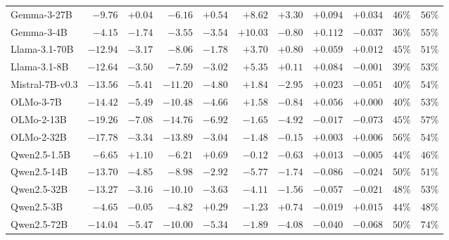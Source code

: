\begin{table}[tb]
\begin{tabular}{lrrrrrrrrrr}
Gemma-3-27B & $\mathbf{-9.76}$ & $+0.04$ & $\mathbf{-6.16}$ & $+0.54$ & $\mathbf{+8.62}$ & $\mathbf{+3.30}$ & $\mathbf{+0.094}$ & $\mathbf{+0.034}$ & $46\%$ & $56\%$ \\
Gemma-3-4B & $\mathbf{-4.15}$ & $\mathbf{-1.74}$ & $\mathbf{-3.55}$ & $\mathbf{-3.54}$ & $\mathbf{+10.03}$ & $-0.80$ & $\mathbf{+0.112}$ & $\mathbf{-0.037}$ & $36\%$ & $55\%$ \\
Llama-3.1-70B & $\mathbf{-12.94}$ & $\mathbf{-3.17}$ & $\mathbf{-8.06}$ & $\mathbf{-1.78}$ & $\mathbf{+3.70}$ & $+0.80$ & $\mathbf{+0.059}$ & $+0.012$ & $45\%$ & $51\%$ \\
Llama-3.1-8B & $\mathbf{-12.64}$ & $\mathbf{-3.50}$ & $\mathbf{-7.59}$ & $\mathbf{-3.02}$ & $\mathbf{+5.35}$ & $+0.11$ & $\mathbf{+0.084}$ & $-0.001$ & $39\%$ & $53\%$ \\
Mistral-7B-v0.3 & $\mathbf{-13.56}$ & $\mathbf{-5.41}$ & $\mathbf{-11.20}$ & $\mathbf{-4.80}$ & $\mathbf{+1.84}$ & $\mathbf{-2.95}$ & $\mathbf{+0.023}$ & $\mathbf{-0.051}$ & $40\%$ & $54\%$ \\
OLMo-3-7B & $\mathbf{-14.42}$ & $\mathbf{-5.49}$ & $\mathbf{-10.48}$ & $\mathbf{-4.66}$ & $\mathbf{+1.58}$ & $-0.84$ & $\mathbf{+0.056}$ & $+0.000$ & $40\%$ & $53\%$ \\
OLMo-2-13B & $\mathbf{-19.26}$ & $\mathbf{-7.08}$ & $\mathbf{-14.76}$ & $\mathbf{-6.92}$ & $\mathbf{-1.65}$ & $\mathbf{-4.92}$ & $\mathbf{-0.017}$ & $\mathbf{-0.073}$ & $45\%$ & $57\%$ \\
OLMo-2-32B & $\mathbf{-17.78}$ & $\mathbf{-3.34}$ & $\mathbf{-13.89}$ & $\mathbf{-3.04}$ & $\mathbf{-1.48}$ & $-0.15$ & $+0.003$ & $+0.006$ & $56\%$ & $54\%$ \\
Qwen2.5-1.5B & $\mathbf{-6.65}$ & $+1.10$ & $\mathbf{-6.21}$ & $+0.69$ & $-0.12$ & $-0.63$ & $+0.013$ & $-0.005$ & $44\%$ & $46\%$ \\
Qwen2.5-14B & $\mathbf{-13.70}$ & $\mathbf{-4.85}$ & $\mathbf{-8.98}$ & $\mathbf{-2.92}$ & $\mathbf{-5.77}$ & $\mathbf{-1.74}$ & $\mathbf{-0.086}$ & $\mathbf{-0.024}$ & $50\%$ & $51\%$ \\
Qwen2.5-32B & $\mathbf{-13.27}$ & $\mathbf{-3.16}$ & $\mathbf{-10.10}$ & $\mathbf{-3.63}$ & $\mathbf{-4.11}$ & $\mathbf{-1.56}$ & $\mathbf{-0.057}$ & $\mathbf{-0.021}$ & $48\%$ & $53\%$ \\
Qwen2.5-3B & $\mathbf{-4.65}$ & $-0.05$ & $\mathbf{-4.82}$ & $+0.29$ & $\mathbf{-1.23}$ & $+0.74$ & $-0.019$ & $+0.015$ & $44\%$ & $48\%$ \\
Qwen2.5-72B & $\mathbf{-14.04}$ & $\mathbf{-5.47}$ & $\mathbf{-10.00}$ & $\mathbf{-5.34}$ & $\mathbf{-1.89}$ & $\mathbf{-4.08}$ & $\mathbf{-0.040}$ & $\mathbf{-0.068}$ & $50\%$ & $74\%$ \\

\end{tabular}
\end{table}
